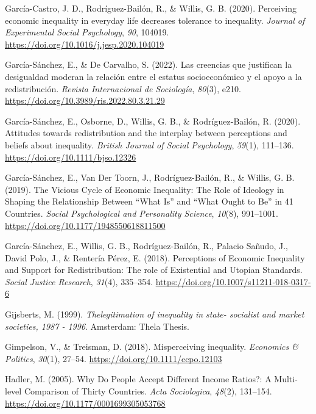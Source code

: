 \documentclass[
  12pt,
]{article}
\newlength{\cslhangindent}
\newenvironment{CSLReferences}[2] %
 {\begin{list}{}{%
  \setlength{\itemindent}{0pt}
  \setlength{\leftmargin}{0pt}
  \setlength{\parsep}{0pt}
  \ifodd #1
   \setlength{\leftmargin}{\cslhangindent}
   \setlength{\itemindent}{-1\cslhangindent}
  \fi
  \setlength{\itemsep}{#2\baselineskip}}}
 {\end{list}}
\begin{document}
\begin{CSLReferences}{1}{0}
García-Castro, J. D., Rodríguez-Bailón, R., \& Willis, G. B. (2020).
Perceiving economic inequality in everyday life decreases tolerance to
inequality. \emph{Journal of Experimental Social Psychology}, \emph{90},
104019. \url{https://doi.org/10.1016/j.jesp.2020.104019}

García-Sánchez, E., \& De Carvalho, S. (2022). Las creencias que
justifican la desigualdad moderan la relaci{ó}n entre el estatus
socioecon{ó}mico y el apoyo a la redistribuci{ó}n. \emph{Revista
Internacional de Sociolog{í}a}, \emph{80}(3), e210.
\url{https://doi.org/10.3989/ris.2022.80.3.21.29}

García-Sánchez, E., Osborne, D., Willis, G. B., \& Rodríguez-Bailón, R.
(2020). Attitudes towards redistribution and the interplay between
perceptions and beliefs about inequality. \emph{British Journal of
Social Psychology}, \emph{59}(1), 111--136.
\url{https://doi.org/10.1111/bjso.12326}

García-Sánchez, E., Van Der Toorn, J., Rodríguez-Bailón, R., \& Willis,
G. B. (2019). The {Vicious Cycle} of {Economic Inequality}: {The Role}
of {Ideology} in {Shaping} the {Relationship Between} {``{What Is}''}
and {``{What Ought} to {Be}''} in 41 {Countries}. \emph{Social
Psychological and Personality Science}, \emph{10}(8), 991--1001.
\url{https://doi.org/10.1177/1948550618811500}

García-Sánchez, E., Willis, G. B., Rodríguez-Bailón, R., Palacio Sañudo,
J., David Polo, J., \& Rentería Pérez, E. (2018). Perceptions of
{Economic Inequality} and {Support} for {Redistribution}: {The} role of
{Existential} and {Utopian Standards}. \emph{Social Justice Research},
\emph{31}(4), 335--354. \url{https://doi.org/10.1007/s11211-018-0317-6}

Gijsberts, M. (1999). \emph{{Thelegitimation of inequality in state-
socialist and market societies, 1987 - 1996}}. Amsterdam: Thela Thesis.

Gimpelson, V., \& Treisman, D. (2018). Misperceiving inequality.
\emph{Economics \& Politics}, \emph{30}(1), 27--54.
\url{https://doi.org/10.1111/ecpo.12103}

Hadler, M. (2005). Why {Do People Accept Different Income Ratios}?: {A
Multi-level Comparison} of {Thirty Countries}. \emph{Acta Sociologica},
\emph{48}(2), 131--154. \url{https://doi.org/10.1177/0001699305053768}


\end{CSLReferences}
\end{document}
